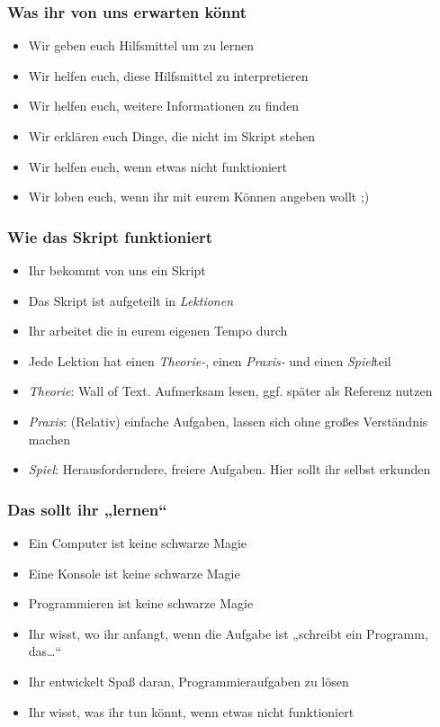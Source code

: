 	\begin{frame}
		\frametitle{Was ihr von uns erwarten könnt}
		\begin{itemize}
			\item Wir geben euch Hilfsmittel um zu lernen
			\pause\item Wir helfen euch, diese Hilfsmittel zu interpretieren
			\pause\item Wir helfen euch, weitere Informationen zu finden
			\pause\item Wir erklären euch Dinge, die nicht im Skript stehen
			\pause\item Wir helfen euch, wenn etwas nicht funktioniert
			\pause\item Wir loben euch, wenn ihr mit eurem Können angeben wollt ;)
		\end{itemize}
	\end{frame}
	
	\begin{frame}
		\frametitle{Wie das Skript funktioniert}
		\begin{itemize}
			\item Ihr bekommt von uns ein Skript
			\pause\item Das Skript ist aufgeteilt in \emph{Lektionen}
			\pause\item Ihr arbeitet die in eurem eigenen Tempo durch
			\pause\item Jede Lektion hat einen \emph{Theorie-}, einen
			\emph{Praxis-} und einen \emph{Spiel}teil
			\pause\item \emph{Theorie}: Wall of Text. Aufmerksam lesen, ggf. später
			als Referenz nutzen
			\pause\item \emph{Praxis}: (Relativ) einfache Aufgaben, lassen sich
			ohne großes Verständnis machen
			\pause\item \emph{Spiel}: Herausforderndere, freiere Aufgaben. Hier
			sollt ihr selbst erkunden
		\end{itemize}
	\end{frame}
	
	\begin{frame}
		\frametitle{Das sollt ihr „lernen“}
		\begin{itemize}
			\item Ein Computer ist keine schwarze Magie
			\pause\item Eine Konsole ist keine schwarze Magie
			\pause\item Programmieren ist keine schwarze Magie
			\pause\item Ihr wisst, wo ihr anfangt, wenn die Aufgabe ist „schreibt
			ein Programm, das\dots“
			\pause\item Ihr entwickelt Spaß daran, Programmieraufgaben zu lösen
			\pause\item Ihr wisst, was ihr tun könnt, wenn etwas nicht funktioniert
		\end{itemize}
	\end{frame}
	
